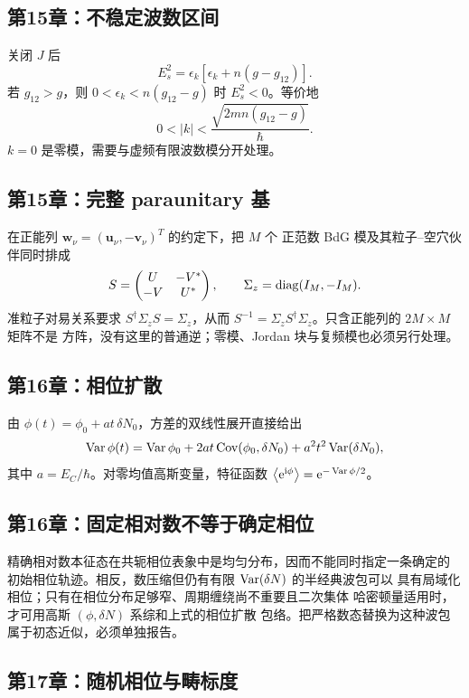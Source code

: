 \subsection*{第15章：不稳定波数区间}

关闭 $J$ 后
\[
  E_s^2=\epsilon_k[\epsilon_k+n(g-g_{12})].
\]
若 $g_{12}>g$，则
$0<\epsilon_k<n(g_{12}-g)$ 时 $E_s^2<0$。等价地
\[
  0<|k|<\frac{\sqrt{2mn(g_{12}-g)}}{\hbar}.
\]
$k=0$ 是零模，需要与虚频有限波数模分开处理。

\subsection*{第15章：完整 paraunitary 基}

在正能列 $\bm w_\nu=(\bm u_\nu,-\bm v_\nu)^T$ 的约定下，把 $M$ 个
正范数 BdG 模及其粒子--空穴伙伴同时排成
\[
  S=\begin{pmatrix}U&-V^*\\-V&U^*\end{pmatrix},
  \qquad \Sigma_z=\operatorname{diag}(I_M,-I_M).
\]
准粒子对易关系要求 $S^\dagger\Sigma_zS=\Sigma_z$，从而
$S^{-1}=\Sigma_zS^\dagger\Sigma_z$。只含正能列的 $2M\times M$ 矩阵不是
方阵，没有这里的普通逆；零模、Jordan 块与复频模也必须另行处理。

\subsection*{第16章：相位扩散}

由 $\phi(t)=\phi_0+at\,\delta N_0$，方差的双线性展开直接给出
\[
  \operatorname{Var}\phi(t)=\operatorname{Var}\phi_0+2at\operatorname{Cov}(\phi_0,\delta N_0)
  +a^2t^2\operatorname{Var}(\delta N_0),
\]
其中 $a=E_C/\hbar$。对零均值高斯变量，特征函数
$\left\langle \mathrm{e}^{\mathrm{i}\phi}\right\rangle=\mathrm{e}^{-\operatorname{Var}\phi/2}$。

\subsection*{第16章：固定相对数不等于确定相位}

精确相对数本征态在共轭相位表象中是均匀分布，因而不能同时指定一条确定的
初始相位轨迹。相反，数压缩但仍有有限 $\operatorname{Var}(\delta N)$ 的半经典波包可以
具有局域化相位；只有在相位分布足够窄、周期缠绕尚不重要且二次集体
哈密顿量适用时，才可用高斯 $(\phi,\delta N)$ 系综和上式的相位扩散
包络。把严格数态替换为这种波包属于初态近似，必须单独报告。

\subsection*{第17章：随机相位与畴标度}

